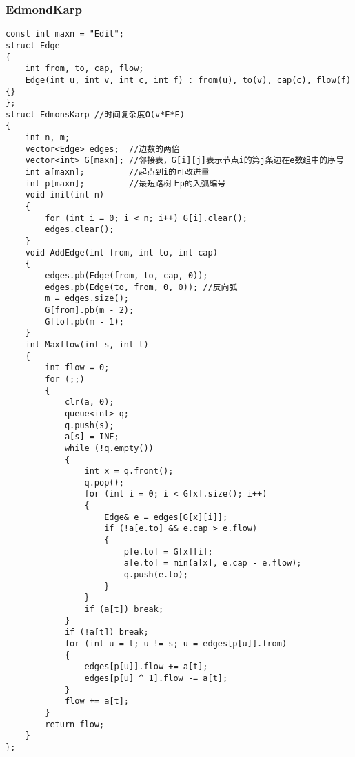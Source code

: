 \documentclass[twoside]{article}
\begin{document}
\subsubsection{EdmondKarp}
\begin{lstlisting}
const int maxn = "Edit";
struct Edge
{
    int from, to, cap, flow;
    Edge(int u, int v, int c, int f) : from(u), to(v), cap(c), flow(f) {}
};
struct EdmonsKarp //时间复杂度O(v*E*E)
{
    int n, m;
    vector<Edge> edges;  //边数的两倍
    vector<int> G[maxn]; //邻接表，G[i][j]表示节点i的第j条边在e数组中的序号
    int a[maxn];         //起点到i的可改进量
    int p[maxn];         //最短路树上p的入弧编号
    void init(int n)
    {
        for (int i = 0; i < n; i++) G[i].clear();
        edges.clear();
    }
    void AddEdge(int from, int to, int cap)
    {
        edges.pb(Edge(from, to, cap, 0));
        edges.pb(Edge(to, from, 0, 0)); //反向弧
        m = edges.size();
        G[from].pb(m - 2);
        G[to].pb(m - 1);
    }
    int Maxflow(int s, int t)
    {
        int flow = 0;
        for (;;)
        {
            clr(a, 0);
            queue<int> q;
            q.push(s);
            a[s] = INF;
            while (!q.empty())
            {
                int x = q.front();
                q.pop();
                for (int i = 0; i < G[x].size(); i++)
                {
                    Edge& e = edges[G[x][i]];
                    if (!a[e.to] && e.cap > e.flow)
                    {
                        p[e.to] = G[x][i];
                        a[e.to] = min(a[x], e.cap - e.flow);
                        q.push(e.to);
                    }
                }
                if (a[t]) break;
            }
            if (!a[t]) break;
            for (int u = t; u != s; u = edges[p[u]].from)
            {
                edges[p[u]].flow += a[t];
                edges[p[u] ^ 1].flow -= a[t];
            }
            flow += a[t];
        }
        return flow;
    }
};
\end{lstlisting}
\end{document}
